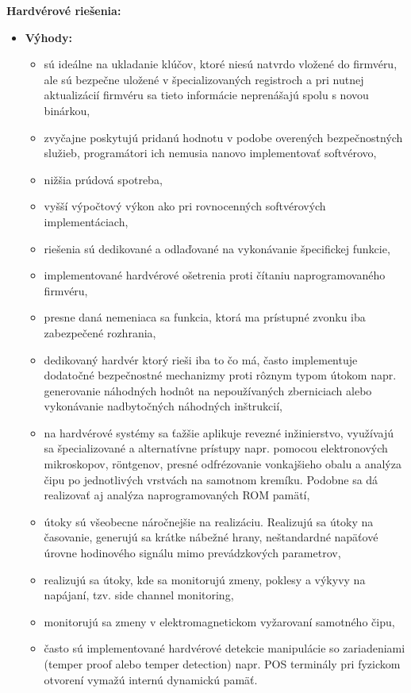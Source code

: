 \documentclass[12pt,a4wide,oneside,openright]{report}
\begin{document}
	\textbf{Hardvérové riešenia:}
	\begin{itemize}
		\item \textbf{Výhody:}
		\begin{itemize}
			\item sú ideálne na ukladanie klúčov, ktoré niesú natvrdo vložené do firmvéru, ale sú bezpečne uložené v špecializovaných registroch a pri nutnej aktualizácií firmvéru sa tieto informácie neprenášajú spolu s novou binárkou,
			\item zvyčajne poskytujú pridanú hodnotu v podobe overených bezpečnostných služieb, programátori ich nemusia nanovo implementovať softvérovo, 
			\item nižšia prúdová spotreba,
			\item vyšší výpočtový výkon ako pri rovnocenných softvérových implementáciach,
			\item riešenia sú dedikované a odlaďované na vykonávanie špecifickej funkcie,
			\item implementované hardvérové ošetrenia proti čítaniu naprogramovaného firmvéru,
			\item presne daná nemeniaca sa funkcia, ktorá ma prístupné zvonku iba zabezpečené rozhrania,
			\item dedikovaný hardvér ktorý rieši iba to čo má, často implementuje dodatočné bezpečnostné mechanizmy proti rôznym typom útokom napr. generovanie náhodných hodnôt na nepoužívaných zberniciach alebo vykonávanie nadbytočných náhodných inštrukcií,
			
			\item na hardvérové systémy sa ťažšie aplikuje revezné inžinierstvo, využívajú sa špecializované a alternatívne prístupy napr. pomocou elektronových mikroskopov, röntgenov, presné odfrézovanie vonkajšieho obalu a analýza čipu po jednotlivých vrstvách na samotnom kremíku. Podobne sa dá realizovať aj analýza naprogramovaných ROM pamätí,
			\item útoky sú všeobecne náročnejšie na realizáciu. Realizujú sa útoky na časovanie, generujú sa krátke nábežné hrany, neštandardné napäťové úrovne hodinového signálu mimo prevádzkových parametrov,  
			\item realizujú sa útoky, kde sa monitorujú zmeny, poklesy a výkyvy na napájaní, tzv. side channel monitoring,
			\item monitorujú sa zmeny v elektromagnetickom vyžarovaní samotného čipu,
			\item často sú implementované hardvérové detekcie manipulácie so zariadeniami (temper proof alebo temper detection) napr. POS terminály pri fyzickom otvorení vymažú internú dynamickú pamäť.			


\end{itemize}
\end{itemize}
\end{document}
